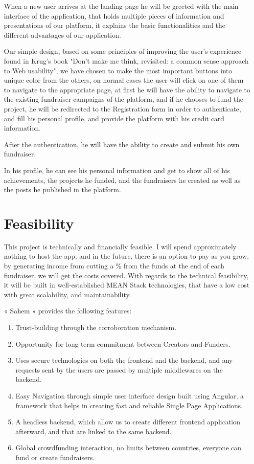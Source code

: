 When a new user arrives at the landing page he will be greeted with the main interface of the application, that holds multiple pieces of information and presentations of our platform, it explains the basic functionalities and the different advantages of our application.

Our simple design, based on some principles of improving the user's experience found in Krug's book "Don't make me think, revisited: a common sense approach to Web usability", we have chosen to make the most important buttons into unique color from the others, on normal cases the user will click on one of them to navigate to the appropriate page, at first he will have the ability to navigate to the existing fundraiser campaigns of the platform, and if he chooses to fund the project, he will be redirected to the Registration form in order to authenticate, and fill his personal profile, and provide the platform with his credit card information.

After the authentication, he will have the ability to create and submit his own fundraiser.

In his profile, he can see his personal information and get to show all of his achievements, the projects he funded, and the fundraisers he created as well as the posts he published in the platform. 

\section{Feasibility}
This project is technically and financially feasible. I will spend approximately nothing to host the app, and in the future, there is an option to pay as you grow, by generating income from cutting a \% from the funds at the end of each fundraiser, we will get the costs covered. With regards to the technical feasibility, it will be built in well-established MEAN Stack technologies, that have a low cost with great scalability, and maintainability.

« Sahem » provides the following features:
\begin{enumerate}
      \item Trust-building through the corroboration mechanism.
      \item
            Opportunity for long term commitment between Creators and Funders.
      \item
            Uses secure technologies on both the frontend and the backend, and any requests sent by the users are passed by multiple middlewares on the backend.
      \item
            Easy Navigation through simple user interface design built using Angular, a framework that helps in creating fast and reliable Single Page Applications.
      \item
            A headless backend, which allow us to create different frontend application afterward, and that are linked to the same backend.
      \item
            Global crowdfunding interaction, no limits between countries, everyone can fund or create fundraisers.
\end{enumerate}
